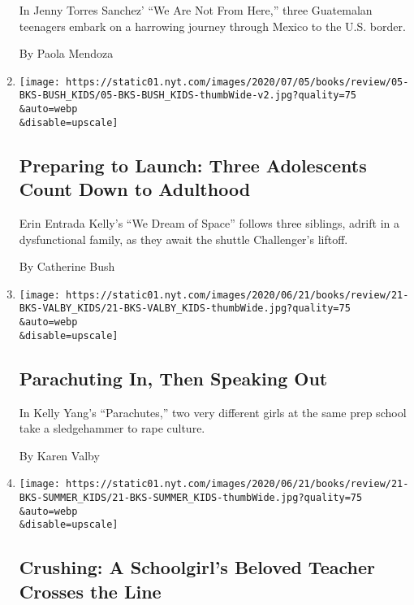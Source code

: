 \begin{enumerate}
  In Jenny Torres Sanchez' ``We Are Not From Here,'' three Guatemalan
  teenagers embark on a harrowing journey through Mexico to the U.S.
  border.

  By Paola Mendoza
\item
  \href{/2020/06/27/books/review/erin-entrada-kelly-we-dream-of-space.html}{}

  \texttt{[image: https://static01.nyt.com/images/2020/07/05/books/review/05-BKS-BUSH\_KIDS/05-BKS-BUSH\_KIDS-thumbWide-v2.jpg?quality=75\\\&auto=webp\\\&disable=upscale]}

  \hypertarget{preparing-to-launch-three-adolescents-count-down-to-adulthood}{%
  \subsection{Preparing to Launch: Three Adolescents Count Down to
  Adulthood}\label{preparing-to-launch-three-adolescents-count-down-to-adulthood}}

  Erin Entrada Kelly's ``We Dream of Space'' follows three siblings,
  adrift in a dysfunctional family, as they await the shuttle
  Challenger's liftoff.

  By Catherine Bush
\item
  \href{/2020/06/12/books/review/kelly-yang-parachutes.html}{}

  \texttt{[image: https://static01.nyt.com/images/2020/06/21/books/review/21-BKS-VALBY\_KIDS/21-BKS-VALBY\_KIDS-thumbWide.jpg?quality=75\\\&auto=webp\\\&disable=upscale]}

  \hypertarget{parachuting-in-then-speaking-out}{%
  \subsection{Parachuting In, Then Speaking
  Out}\label{parachuting-in-then-speaking-out}}

  In Kelly Yang's ``Parachutes,'' two very different girls at the same
  prep school take a sledgehammer to rape culture.

  By Karen Valby
\item
  \href{/2020/06/12/books/review/candace-bushnell-katie-cotugno-rules-for-being-a-girl.html}{}

  \texttt{[image: https://static01.nyt.com/images/2020/06/21/books/review/21-BKS-SUMMER\_KIDS/21-BKS-SUMMER\_KIDS-thumbWide.jpg?quality=75\\\&auto=webp\\\&disable=upscale]}

  \hypertarget{crushing-a-schoolgirls-beloved-teacher-crosses-the-line}{%
  \subsection{Crushing: A Schoolgirl's Beloved Teacher Crosses the
  Line}\label{crushing-a-schoolgirls-beloved-teacher-crosses-the-line}}


\end{enumerate}
